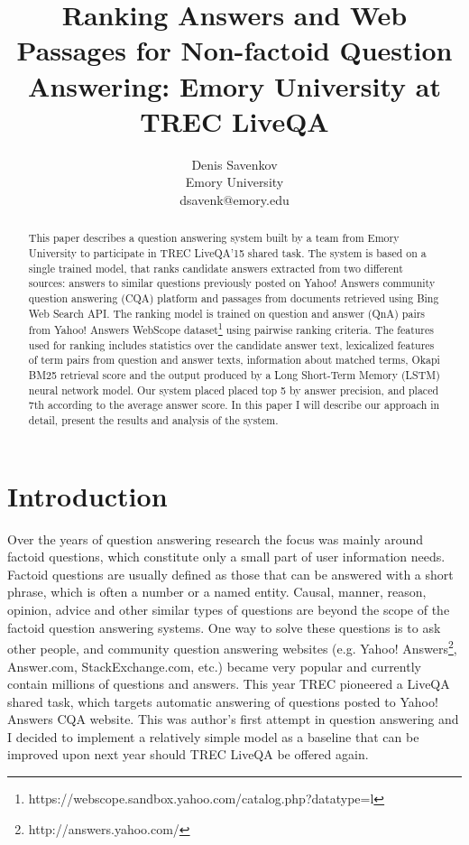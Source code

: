 \documentclass[]{article}
\title{Ranking Answers and Web Passages for Non-factoid Question Answering: Emory University at TREC LiveQA}
\author{Denis Savenkov\\Emory University\\dsavenk@emory.edu}
\date{}
\begin{document}
\maketitle

\begin{abstract}
This paper describes a question answering system built by a team from Emory University to participate in TREC LiveQA'15 shared task.
The system is based on a single trained model, that ranks candidate answers extracted from two different sources: answers to similar questions previously posted on Yahoo! Answers community question answering (CQA) platform and passages from documents retrieved using Bing Web Search API.
The ranking model is trained on question and answer (QnA) pairs from Yahoo! Answers WebScope dataset\footnote{https://webscope.sandbox.yahoo.com/catalog.php?datatype=l} using pairwise ranking criteria.
The features used for ranking includes statistics over the candidate answer text, lexicalized features of term pairs from question and answer texts, information about matched terms, Okapi BM25 retrieval score and the output produced by a Long Short-Term Memory (LSTM) neural network model.
Our system placed placed top 5 by answer precision, and placed 7th according to the average answer score.
In this paper I will describe our approach in detail, present the results and analysis of the system.

\end{abstract}

\section{Introduction}
Over the years of question answering research the focus was mainly around factoid questions, which constitute only a small part of user information needs.
Factoid questions are usually defined as those that can be answered with a short phrase, which is often a number or a named entity.
Causal, manner, reason, opinion, advice and other similar types of questions are beyond the scope of the factoid question answering systems.
One way to solve these questions is to ask other people, and community question answering websites (e.g. Yahoo! Answers\footnote{http://answers.yahoo.com/}, Answer.com, StackExchange.com, etc.) became very popular and currently contain millions of questions and answers.
This year TREC pioneered a LiveQA shared task, which targets automatic answering of questions posted to Yahoo! Answers CQA website.
This was author's first attempt in question answering and I decided to implement a relatively simple model as a baseline that can be improved upon next year should TREC LiveQA be offered again.
\end{document}
